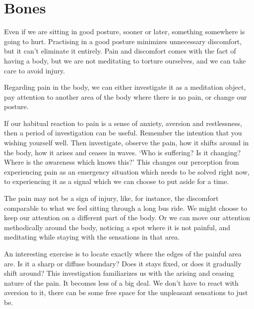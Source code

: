 \chapter{Bones}


\noindent Even if we are sitting in good posture, sooner or later,
something somewhere is going to hurt. Practising in a good posture
minimizes unnecessary discomfort, but it can't eliminate it entirely.
Pain and discomfort comes with the fact of having a body, but we are not
meditating to torture ourselves, and we can take care to avoid injury.

Regarding pain in the body, we can either investigate it as a meditation
object, pay attention to another area of the body where there is no
pain, or change our posture.

If our habitual reaction to pain is a sense of anxiety, aversion and
restlessness, then a period of investigation can be useful. Remember the
intention that you wishing yourself well. Then investigate, observe the
pain, how it shifts around in the body, how it arises and ceases in
waves. `Who is suffering? Is it changing? Where is the awareness which
knows this?' This changes our perception from experiencing pain as an
emergency situation which needs to be solved right now, to experiencing
it as a signal which we can choose to put aside for a time.

\enlargethispage*{\baselineskip}

The pain may not be a sign of injury, like, for instance, the discomfort
comparable to what we feel sitting through a long bus ride. We might
choose to keep our attention on a different part of the body. Or we can
move our attention methodically around the body, noticing a spot where
it is not painful, and meditating while staying with the sensations in
that area.

\clearpage
\null\thispagestyle{empty}%
%
%
\label{illus-standing-meditation}%
\clearpage

An interesting exercise is to locate exactly where the edges of the
painful area are. Is it a sharp or diffuse boundary? Does it stays
fixed, or does it gradually shift around? This investigation
familiarizes us with the arising and ceasing nature of the pain. It
becomes less of a big deal. We don't have to react with aversion to it,
there can be some free space for the unpleasant sensations to just be.


